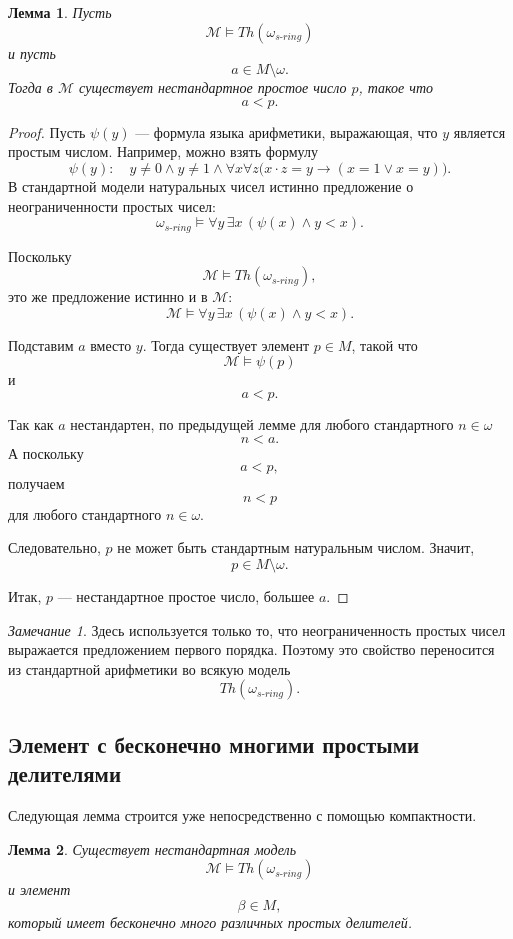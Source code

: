 \documentclass[12pt,a4paper,oneside,openany]{book}
\theoremstyle{definition}
\theoremstyle{plain}
\newtheorem{lemma}{Лемма}[chapter]
\theoremstyle{remark}
\newtheorem{remark}{Замечание}[chapter]
\begin{document}
\begin{lemma}
Пусть
\[
\mathcal M\models Th(\omega_{s\text{-}ring})
\]
и пусть
\[
a\in M\setminus\omega.
\]
Тогда в \(\mathcal M\) существует нестандартное простое число \(p\), такое что
\[
a<p.
\]
\end{lemma}

\begin{proof}
Пусть \(\psi(y)\) — формула языка арифметики, выражающая, что \(y\) является простым числом. Например, можно взять формулу
\[
\psi(y):
\quad
y\ne 0\wedge y\ne 1
\wedge
\forall x\forall z
\bigl(x\cdot z=y\to (x=1\vee x=y)\bigr).
\]
В стандартной модели натуральных чисел истинно предложение о неограниченности простых чисел:
\[
\omega_{s\text{-}ring}
\models
\forall y\,\exists x\,(\psi(x)\wedge y<x).
\]

Поскольку
\[
\mathcal M\models Th(\omega_{s\text{-}ring}),
\]
это же предложение истинно и в \(\mathcal M\):
\[
\mathcal M
\models
\forall y\,\exists x\,(\psi(x)\wedge y<x).
\]

Подставим \(a\) вместо \(y\). Тогда существует элемент \(p\in M\), такой что
\[
\mathcal M\models \psi(p)
\]
и
\[
a<p.
\]

Так как \(a\) нестандартен, по предыдущей лемме для любого стандартного \(n\in\omega\)
\[
n<a.
\]
А поскольку
\[
a<p,
\]
получаем
\[
n<p
\]
для любого стандартного \(n\in\omega\).

Следовательно, \(p\) не может быть стандартным натуральным числом. Значит,
\[
p\in M\setminus\omega.
\]

Итак, \(p\) — нестандартное простое число, большее \(a\).
\end{proof}

\begin{remark}
Здесь используется только то, что неограниченность простых чисел выражается предложением первого порядка. Поэтому это свойство переносится из стандартной арифметики во всякую модель
\[
Th(\omega_{s\text{-}ring}).
\]
\end{remark}

\subsection{Элемент с бесконечно многими простыми делителями}

Следующая лемма строится уже непосредственно с помощью компактности.

\begin{lemma}
Существует нестандартная модель
\[
\mathcal M\models Th(\omega_{s\text{-}ring})
\]
и элемент
\[
\beta\in M,
\]
который имеет бесконечно много различных простых делителей.
\end{lemma}
\end{document}
